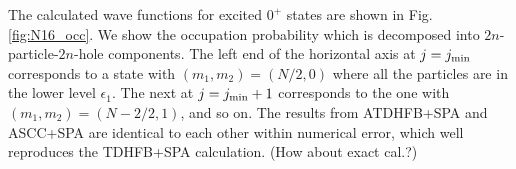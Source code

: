 \documentclass[%
superscriptaddress,
showpacs,
nofootinbib,
amsmath,amssymb,
aps,
prc,
twocolumn,
floatfix ]%
{revtex4-1}
\begin{document}
The calculated wave functions for excited $0^+$ states 
are shown in Fig. \ref{fig:N16_occ}. 
We show the occupation probability which is decomposed 
into $2n$-particle-$2n$-hole components. 
The left end of the horizontal axis at $j=j_{\rm min}$
corresponds to a state with $(m_1,m_2)=(N/2,0)$ where all the particles
are in the lower level $\epsilon_1$.
The next at $j=j_{\rm min}+1$ corresponds to the one with
$(m_1,m_2)=(N-2/2,1)$, and so on.
The results from ATDHFB+SPA and ASCC+SPA are identical to each other
within numerical error, which well reproduces
the TDHFB+SPA calculation.
(How about exact cal.?)

%
%
\end{document}
